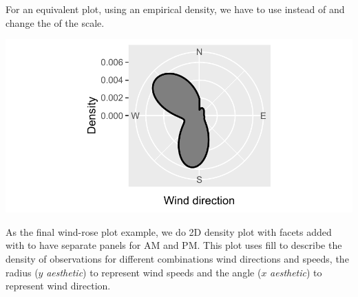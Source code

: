 \documentclass[krantz2]{krantz}\usepackage{knitr}
\begin{document}
For an equivalent plot, using an empirical density, we have to use  instead of  and change the  of the  scale.

\begin{knitrout}\footnotesize
{}\color{fgcolor}

{\centering \includegraphics[width=.7\textwidth]{figure/pos-wind-06-1} 

}



\end{knitrout}

As the final wind-rose plot example, we do 2D density plot with facets added with  to have separate panels for AM and PM. This plot uses fill to describe the density of observations for different combinations wind directions and speeds, the radius ($y$ \emph{aesthetic}) to represent wind speeds and the angle ($x$ \emph{aesthetic}) to represent wind direction.

\begin{knitrout}\footnotesize
{}\color{fgcolor}\begin{kframe}
\begin{alltt}
\hlopt{$}
\end{alltt}
\end{kframe}
\end{knitrout}
\end{document}
